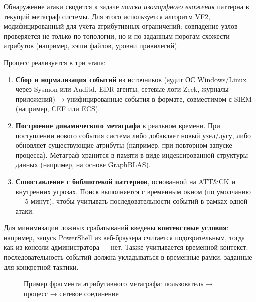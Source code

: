 Обнаружение атаки сводится к задаче \textit{поиска изоморфного вложения} паттерна в текущий метаграф системы. Для этого используется алгоритм VF2, модифицированный для учёта атрибутивных ограничений: совпадение узлов проверяется не только по топологии, но и по заданным порогам схожести атрибутов (например, хэши файлов, уровни привилегий).

Процесс реализуется в три этапа:
\begin{enumerate}
    \item \textbf{Сбор и нормализация событий} из источников (аудит ОС Windows/Linux через Sysmon или Auditd, EDR-агенты, сетевые логи Zeek, журналы приложений) → унифицированные события в формате, совместимом с SIEM (например, CEF или ECS).
    \item \textbf{Построение динамического метаграфа} в реальном времени. При поступлении нового события система либо добавляет новый узел/дугу, либо обновляет существующие атрибуты (например, при повторном запуске процесса). Метаграф хранится в памяти в виде индексированной структуры данных (например, на основе GraphBLAS).
    \item \textbf{Сопоставление с библиотекой паттернов}, основанной на ATT\&CK и внутренних угрозах. Поиск выполняется с временным окном (по умолчанию — 5 минут), чтобы учитывать последовательности событий в рамках одной атаки.
\end{enumerate}

Для минимизации ложных срабатываний введены \textbf{контекстные условия}: например, запуск PowerShell из веб-браузера считается подозрительным, тогда как из консоли администратора — нет. Также учитывается временной контекст: последовательность событий должна укладываться в временные рамки, заданные для конкретной тактики.

\begin{figure}[ht]
\centering
\resizebox{0.9\textwidth}{!}{}
\caption{Пример фрагмента атрибутивного метаграфа: пользователь → процесс → сетевое соединение}
\end{figure}